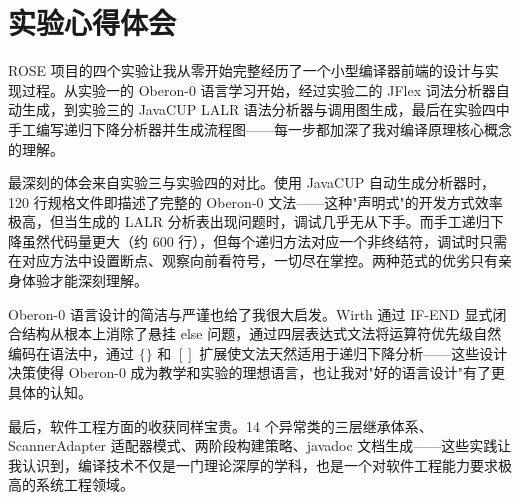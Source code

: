 \section{实验心得体会}

ROSE 项目的四个实验让我从零开始完整经历了一个小型编译器前端的设计与实现过程。从实验一的 Oberon-0 语言学习开始，经过实验二的 JFlex 词法分析器自动生成，到实验三的 JavaCUP LALR 语法分析器与调用图生成，最后在实验四中手工编写递归下降分析器并生成流程图——每一步都加深了我对编译原理核心概念的理解。

最深刻的体会来自实验三与实验四的对比。使用 JavaCUP 自动生成分析器时，120 行规格文件即描述了完整的 Oberon-0 文法——这种"声明式"的开发方式效率极高，但当生成的 LALR 分析表出现问题时，调试几乎无从下手。而手工递归下降虽然代码量更大（约 600 行），但每个递归方法对应一个非终结符，调试时只需在对应方法中设置断点、观察向前看符号，一切尽在掌控。两种范式的优劣只有亲身体验才能深刻理解。

Oberon-0 语言设计的简洁与严谨也给了我很大启发。Wirth 通过 IF-END 显式闭合结构从根本上消除了悬挂 else 问题，通过四层表达式文法将运算符优先级自然编码在语法中，通过 $\{\}$ 和 $[]$ 扩展使文法天然适用于递归下降分析——这些设计决策使得 Oberon-0 成为教学和实验的理想语言，也让我对"好的语言设计"有了更具体的认知。

最后，软件工程方面的收获同样宝贵。14 个异常类的三层继承体系、ScannerAdapter 适配器模式、两阶段构建策略、javadoc 文档生成——这些实践让我认识到，编译技术不仅是一门理论深厚的学科，也是一个对软件工程能力要求极高的系统工程领域。
